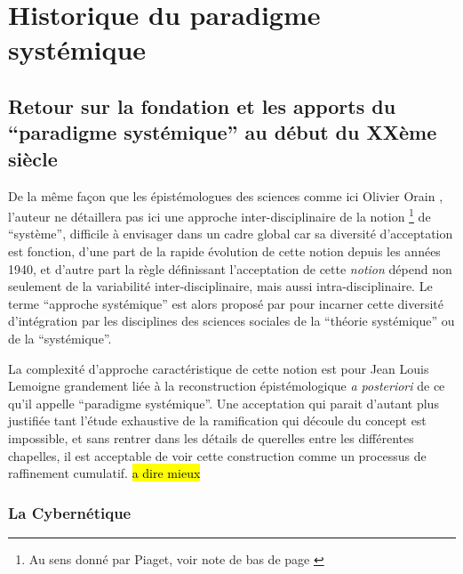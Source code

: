 
\graphicspath{{FigureAnnexe/}}

\appendix
{}
\appendixpage

\renewcommand{\appendixpagename}{Annexes}

\renewcommand{\appendixtocname}{Annexes}


\chapter{Historique du paradigme systémique}

\section{Retour sur la fondation et les apports du \enquote{paradigme systémique} au début du XXème siècle}
\label{ssec:systemique}

De la même façon que les épistémologues des sciences comme ici Olivier Orain \autocite{Orain2001}, l'auteur ne détaillera pas ici une approche inter-disciplinaire de la notion \footnote{Au sens donné par Piaget, voir note de bas de page \autocite {Orain2001}} de \enquote{système}, difficile à envisager dans un cadre global car sa diversité d'acceptation est fonction, d'une part de la rapide évolution de cette notion depuis les années 1940, et d'autre part la règle définissant l'acceptation de cette \textit{notion} dépend non seulement de la variabilité inter-disciplinaire, mais aussi intra-disciplinaire. Le terme \enquote{approche systémique} est alors proposé par \autocite{Orain2001} pour incarner cette diversité d'intégration par les disciplines des sciences sociales de la \enquote{théorie systémique} ou de la \enquote{systémique}.

La complexité d'approche caractéristique de cette notion est pour Jean Louis Lemoigne grandement liée à la reconstruction épistémologique \textit{a posteriori} de ce qu'il appelle \enquote{paradigme systémique}. Une acceptation qui parait d'autant plus justifiée tant l'étude exhaustive de la ramification qui découle du concept est impossible, et sans rentrer dans les détails de querelles entre les différentes chapelles, il est acceptable de voir cette construction comme un processus de raffinement cumulatif. \hl{a dire mieux}

\subsection{La Cybernétique}
\label{ssubsec:cybernetic}

